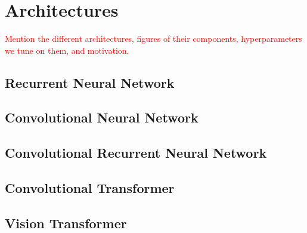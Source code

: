 \chapter{Architectures}

\textcolor{red}{Mention the different architectures, figures of their components, hyperparameters we tune on them, and motivation.}

\section{Recurrent Neural Network}

\section{Convolutional Neural Network}

\section{Convolutional Recurrent Neural Network}

\section{Convolutional Transformer}

\section{Vision Transformer}